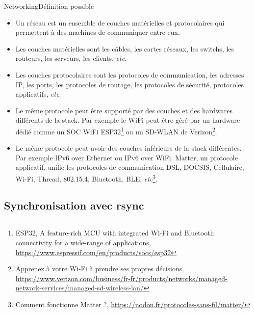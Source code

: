 \documentclass{beamer}
\begin{document}
    \begin{frame}{Networking}{Définition possible}
        \begin{scriptsize}
            \begin{itemize}
                \item Un réseau est un ensemble de couches matérielles et protocolaires qui permettent à des machines de communiquer entre eux.
                \item Les couches matérielles sont les câbles, les cartes réseaux, les switchs, les routeurs, les serveurs, les clients, \textit{etc}.
                \item Les couches protocolaires sont les protocoles de communication, les adresses IP, les ports, les protocoles de routage, les protocoles de sécurité, protocoles applicatifs, \textit{etc}.
                \item Le même protocole peut être supporté par des couches et des hardwares différents de la stack.
                Par exemple le WiFi peut être géré par un hardware dédié comme un SOC WiFi ESP32\footnote{ESP32, A feature-rich MCU with integrated Wi-Fi and Bluetooth connectivity for a wide-range of applications, \url{https://www.espressif.com/en/products/socs/esp32}} ou un SD-WLAN de Verizon\footnote{Apprenez à votre Wi-Fi à prendre ses propres décisions, \url{https://www.verizon.com/business/fr-fr/products/networks/managed-network-services/managed-sd-wireless-lan/}}.
                \item Le même protocole peut avoir des couches inférieurs de la stack différentes.
                Par exemple IPv6 over Ethernet ou IPv6 over WiFi.
                Matter, un protocole applicatif, unifie les protocoles de communication DSL, DOCSIS, Cellulaire, Wi-Fi, Thread, 802.15.4, Bluetooth, BLE, \textit{etc}\footnote{Comment fonctionne Matter ?, \url{https://nodon.fr/protocoles-sans-fil/matter/}}.
            \end{itemize}
        \end{scriptsize}
    \end{frame}

    \subsection{Synchronisation avec rsync}\label{subsec:rsync-syncro}
\end{document}
